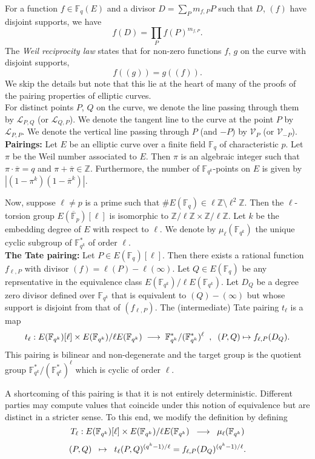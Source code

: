 \documentclass[11pt, lettersize, notitlepage, leqno, footskip=0.6cm]{article}
\newcommand{\bF}{\mathbb F}
\newcommand{\bz}{\mathbb Z}
\newcommand{\bFP}{\ov{\mathbb{F}}_p}
\newcommand{\bFq}{\mathbb{F}_q}
\newcommand{\bFqk}{\mathbb{F}_{q^k}}
\newcommand{\pl}{\prod\limits}
\newcommand{\slim}{\sum\limits}
\newcommand{\lra}{\longrightarrow}
\newcommand{\mc}{\mathcal}
\newcommand{\ov}{\overline}
\newcommand{\vs}{\vspace{-0.15cm}}
\newcommand{\noin}{\noindent}
\numberwithin{equation}{section}
\begin{document}
For a function $f\in \bFq(E)$ and a divisor $D= \slim_{P} m_{f,P}P$ such that $D$, $(f)$ have disjoint supports, we have \vs $$f(D) = \pl_{P} f(P)^{m_{f,P}} .$$ The \textit{Weil reciprocity law} states that for non-zero functions $f$, $g$ on the curve with disjoint supports, \vs $$f((g)) = g((f)) .$$ We skip the details but note that this lie at the heart of many of the proofs of the pairing properties of elliptic curves.\\

For distinct points $P$, $Q$ on the curve, we denote the line passing through them by $\mc{L}_{P,Q}$ (or $\mc{L}_{Q, P}$). We denote the tangent line to the curve at the point $P$ by $\mc{L}_{P, P}$. We denote the vertical line passing through $P$ (and $-P$) by $\mc{V}_P$ (or $\mc{V}_{-P}$). \\



\noin \textbf{Pairings:} Let $E$ be an elliptic curve over a finite field $\bFq$  of characteristic $p$. Let $\pi$ be the Weil number associated to $E$. Then $\pi$ is an algebraic integer such that $\pi\cdot \ov{\pi} = q$ and $\pi+\ov{\pi}\in \bz$. Furthermore, the number of $\bFqk$-points on $E$ is given by $|(1-\pi^k)(1-\ov{\pi}^k)|$.


Now, suppose $\ell\neq p$ is a prime such that $\# E(\bFq)\in \ell\bz\setminus \ell^2\bz$. Then the $\ell$-torsion group $E(\bFP)[\ell]$ is isomorphic to $\bz/\ell\bz \times \bz/\ell\bz$. Let $k$ be the embedding degree of $E$ with respect to $\ell$. We denote by $\mu_{\ell}(\bF _{q^k})$ the unique cyclic subgroup of $\bF _{q^k}^*$ of order $\ell$.\\

\noin \textbf{The Tate pairing:} Let $P\in E(\bFq)[\ell]$. Then there exists a rational function $f_{\ell,P}$ with divisor $(f) = \ell(P) - \ell(\infty)$. Let $Q\in E(\bFq)$ be any reprsentative in the equivalence class $E(\bF _ {q^k})/\ell E(\bF _ {q^k})$. Let $D_Q$ be a degree zero divisor defined over $\bF _ {q^k}$ that is equivalent to $(Q)-(\infty)$ but whose support is disjoint from that of $(f_{\ell,P})$. The (intermediate) Tate pairing $t_{\ell}$ is a map \vs $$t_{\ell}: E(\bF _ {q^k})[\ell]\times E(\bF _ {q^k})/\ell E(\bF _ {q^k})\;\lra\; \bF _ {q^k}^*/(\bF _ {q^k}^*)^{\ell}\;\;,\;\;(P,Q)\mapsto f_{\ell,P}(D_Q) \vs .$$ This pairing is bilinear and non-degenerate and the target group is the quotient group $\bF _ {q^k}^*/(\bF _ {q^k}^*)^{\ell}$ which is cyclic of order $\ell$. 

A shortcoming of this pairing is that it is not entirely deterministic. Different parties may compute values that coincide under this notion of equivalence   but are distinct in a stricter sense. To this end, we modify the definition by defining \vs $$T_{\ell} : E(\bF _ {q^k})[\ell]\times E(\bF _ {q^k})/\ell E(\bF _ {q^k})\;\;\lra\;\; \mu_{\ell}(\bF _ {q^k})\vs $$ \vs $$(P,Q)\;\;\mapsto\;\; t_{\ell}(P,Q)^{(q^k-1)/\ell} = f_{\ell, P}(D_Q)^{(q^k-1)/\ell}. \vs $$  
\end{document}
